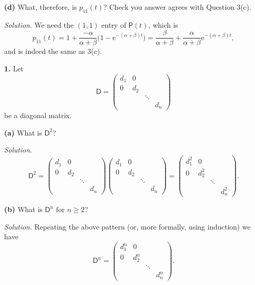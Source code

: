 \documentclass[
  a4paper,
]{article}
\theoremstyle{definition}
\theoremstyle{definition}
\theoremstyle{definition}
\theoremstyle{remark}
\begin{document}
\textbf{(d)} What, therefore, is \(p_{11}(t)\)? Check you answer agrees with Question 3(c).

\begin{myanswers}
\emph{Solution.}
We need the \((1,1)\) entry of \(\mathsf P(t)\), which is
\[ p_{11}(t) = 1 + \frac{-\alpha}{\alpha + \beta} \big(1 - \mathrm{e}^{-(\alpha+\beta)t} \big) = \frac{\beta}{\alpha+\beta} + \frac{\alpha}{\alpha+\beta} \mathrm{e}^{-(\alpha+\beta)t} , \]
and is indeed the same as 3(c).

\end{myanswers}

\textbf{1.} Let
\[ \mathsf D = \begin{pmatrix} d_1 & 0 & &  \\
                               0 & d_2 & &  \\
                                 &  & \ddots & \\
                                &  & & d_n \end{pmatrix}  \]
be a diagonal matrix.

\textbf{(a)} What is \(\mathsf D^2\)?

\begin{myanswers}
\emph{Solution.}
\[ \mathsf D^2 = \begin{pmatrix} d_1 & 0 & &  \\
0 & d_2 & &  \\
&  & \ddots & \\
&  & & d_n \end{pmatrix}\begin{pmatrix} d_1 & 0 & &  \\
0 & d_2 & &  \\
&  & \ddots & \\
&  & & d_n \end{pmatrix} = \begin{pmatrix} d_1^2 & 0 & &  \\
0 & d_2^2 & &  \\
&  & \ddots & \\
&  & & d_n^2 \end{pmatrix} .         \]

\end{myanswers}

\textbf{(b)} What is \(\mathsf D^n\) for \(n \geq 2\)?

\begin{myanswers}
\emph{Solution.}
Repeating the above pattern (or, more formally, using induction) we have
\[ \mathsf D^n = \begin{pmatrix} d_1^n & 0 & &  \\
0 & d_2^n & &  \\
&  & \ddots & \\
&  & & d_n^n \end{pmatrix} .\]

\end{myanswers}
\end{document}
